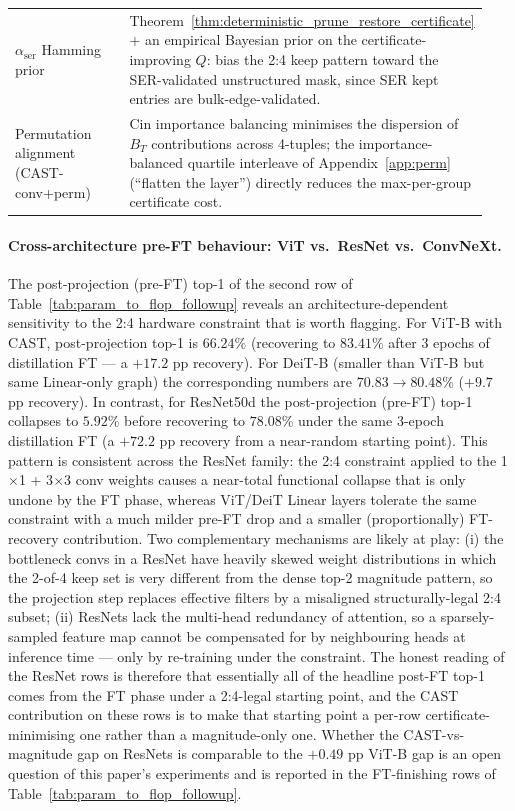 \documentclass[11pt]{article}
\theoremstyle{plain}
\theoremstyle{definition}
\theoremstyle{remark}
\newcommand{\1}{\mathbf{1}}
\begin{document}
\begin{table}[ht]
\begin{tabular}{p{0.32\linewidth}p{0.62\linewidth}}
\addlinespace[2pt]
\(\alpha_{\text{ser}}\) Hamming prior
  & Theorem~\ref{thm:deterministic_prune_restore_certificate} + an empirical Bayesian prior on the certificate-improving \(Q\): bias the 2:4 keep pattern toward the SER-validated unstructured mask, since SER kept entries are bulk-edge-validated. \\
\addlinespace[2pt]
Permutation alignment (CAST-conv+perm)
  & Cin importance balancing minimises the dispersion of \(B_T\) contributions across 4-tuples; the importance-balanced quartile interleave of Appendix~\ref{app:perm} (``flatten the layer'') directly reduces the max-per-group certificate cost. \\
\bottomrule
\end{tabular}
\end{table}

\paragraph{Cross-architecture pre-FT behaviour: ViT vs.\ ResNet vs.\ ConvNeXt.}
The post-projection (pre-FT) top-1 of the second row of Table~\ref{tab:param_to_flop_followup} reveals an architecture-dependent sensitivity to the 2:4 hardware constraint that is worth flagging.  For ViT-B with CAST, post-projection top-1 is \(66.24\%\) (recovering to \(83.41\%\) after \(3\) epochs of distillation FT — a \(+17.2\) pp recovery).  For DeiT-B (smaller than ViT-B but same Linear-only graph) the corresponding numbers are \(70.83\!\rightarrow\!80.48\%\) (\(+9.7\) pp recovery).  In contrast, for ResNet50d the post-projection (pre-FT) top-1 collapses to \(5.92\%\) before recovering to \(78.08\%\) under the same 3-epoch distillation FT (a \(+72.2\) pp recovery from a near-random starting point).  This pattern is consistent across the ResNet family: the 2:4 constraint applied to the 1\(\times\)1 + 3\(\times\)3 conv weights causes a near-total functional collapse that is only undone by the FT phase, whereas ViT/DeiT Linear layers tolerate the same constraint with a much milder pre-FT drop and a smaller (proportionally) FT-recovery contribution.  Two complementary mechanisms are likely at play: (i) the bottleneck convs in a ResNet have heavily skewed weight distributions in which the 2-of-4 keep set is very different from the dense top-2 magnitude pattern, so the projection step replaces effective filters by a misaligned structurally-legal 2:4 subset; (ii) ResNets lack the multi-head redundancy of attention, so a sparsely-sampled feature map cannot be compensated for by neighbouring heads at inference time --- only by re-training under the constraint.  The honest reading of the ResNet rows is therefore that essentially all of the headline post-FT top-1 comes from the FT phase under a 2:4-legal starting point, and the CAST contribution on these rows is to make that starting point a per-row certificate-minimising one rather than a magnitude-only one.  Whether the CAST-vs-magnitude gap on ResNets is comparable to the \(+0.49\) pp ViT-B gap is an open question of this paper's experiments and is reported in the FT-finishing rows of Table~\ref{tab:param_to_flop_followup}.
\end{document}

